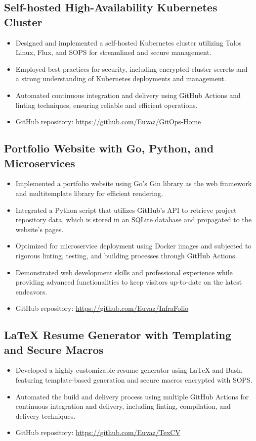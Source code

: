 \documentclass[a4paper]{article}
\begin{document}
\subsection{Self-hosted High-Availability Kubernetes Cluster}
\begin{itemize}[noitemsep,nolistsep]
    \item Designed and implemented a self-hosted Kubernetes cluster utilizing Talos Linux, Flux, and SOPS for streamlined and secure management.
    \item Employed best practices for security, including encrypted cluster secrets and a strong understanding of Kubernetes deployments and management.
    \item Automated continuous integration and delivery using GitHub Actions and linting techniques, ensuring reliable and efficient operations.
    \item GitHub repository: \url{https://github.com/Euvaz/GitOps-Home}
\end{itemize}

\subsection{Portfolio Website with Go, Python, and Microservices}
\begin{itemize}[noitemsep,nolistsep]
    \item Implemented a portfolio website using Go's Gin library as the web framework and multitemplate library for efficient rendering.
    \item Integrated a Python script that utilizes GitHub's API to retrieve project repository data, which is stored in an SQLite database and propagated to the website's pages.
    \item Optimized for microservice deployment using Docker images and subjected to rigorous linting, testing, and building processes through GitHub Actions.
    \item Demonstrated web development skills and professional experience while providing advanced functionalities to keep visitors up-to-date on the latest endeavors.
    \item GitHub repository: \url{https://github.com/Euvaz/InfraFolio}
\end{itemize}

\subsection{LaTeX Resume Generator with Templating and Secure Macros}
\begin{itemize}[noitemsep,nolistsep]
    \item Developed a highly customizable resume generator using LaTeX and Bash, featuring template-based generation and secure macros encrypted with SOPS\@.
    \item Automated the build and delivery process using multiple GitHub Actions for continuous integration and delivery, including linting, compilation, and delivery techniques.
    \item GitHub repository: \url{https://github.com/Euvaz/TexCV}
\end{itemize}
\end{document}
